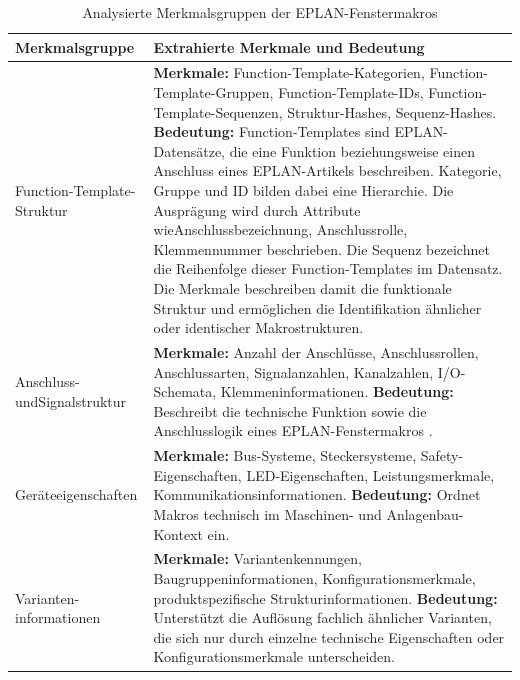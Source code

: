 \begin{table}[H]
    \centering
    \setlength{\tabcolsep}{4pt}
    \renewcommand{\arraystretch}{1.08}
    \caption{Analysierte Merkmalsgruppen der EPLAN-Fenstermakros}
    \label{tab:makrostrukturmerkmale}
    \begin{tabularx}{\textwidth}{>{\raggedright\arraybackslash}p{4.0cm} >{\raggedright\arraybackslash}X}
        \toprule
        \textbf{Merkmalsgruppe} & \textbf{Extrahierte Merkmale und Bedeutung} \\
        \midrule
        Function-Template-\newline Struktur &
        \textbf{Merkmale:} Function-Template-Kategorien, Function-Template-Gruppen, Function-Template-IDs, Function-Template-Sequenzen, Struktur-Hashes, Sequenz-Hashes.\newline
        \textbf{Bedeutung:} Function-Templates sind EPLAN-Datensätze, die eine Funktion beziehungsweise einen Anschluss eines EPLAN-Artikels beschreiben. Kategorie, Gruppe und ID bilden dabei eine Hierarchie. Die Ausprägung wird durch Attribute wieAnschlussbezeichnung, Anschlussrolle, Klemmennummer beschrieben. Die Sequenz bezeichnet die Reihenfolge dieser Function-Templates im Datensatz. Die Merkmale beschreiben damit die funktionale Struktur und ermöglichen die Identifikation ähnlicher oder identischer Makrostrukturen. \\
        \addlinespace
        Anschluss- und\newline Signalstruktur &
        \textbf{Merkmale:} Anzahl der Anschlüsse, Anschlussrollen, Anschlussarten, Signalanzahlen, Kanalzahlen, I/O-Schemata, Klemmeninformationen.\newline
        \textbf{Bedeutung:} Beschreibt die technische Funktion sowie die Anschlusslogik eines EPLAN-Fenstermakros \parencite{EPLAN-Makros}. \\
        \addlinespace
        Geräteeigenschaften &
        \textbf{Merkmale:} Bus-Systeme, Steckersysteme, Safety-Eigenschaften, LED-Eigenschaften, Leistungsmerkmale, Kommunikationsinformationen.\newline
        \textbf{Bedeutung:} Ordnet Makros technisch im Maschinen- und Anlagenbau-Kontext ein. \\
        \addlinespace
        Varianten-\newline informationen &
        \textbf{Merkmale:} Variantenkennungen, Baugruppeninformationen, Konfigurationsmerkmale, produktspezifische Strukturinformationen.\newline
        \textbf{Bedeutung:} Unterstützt die Auflösung fachlich ähnlicher Varianten, die sich nur durch einzelne technische Eigenschaften oder Konfigurationsmerkmale unterscheiden. \\
        \bottomrule
    \end{tabularx}
\end{table}

